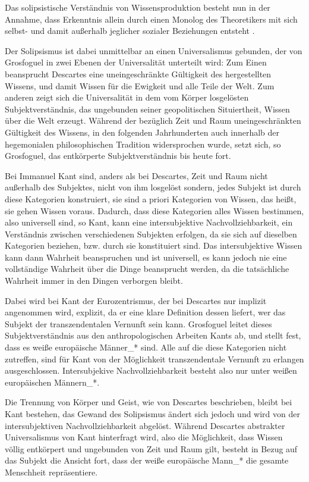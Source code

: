 Das solipsistische Verständnis von Wissensproduktion besteht nun in der
Annahme, dass Erkenntnis allein durch einen Monolog des Theoretikers mit sich
selbst- und damit außerhalb jeglicher sozialer Beziehungen entsteht
\footnotemark {}.

Der Solipsismus ist dabei unmittelbar an einen Universalismus gebunden, der von
Grosfoguel in zwei Ebenen der Universalität unterteilt wird: Zum Einen
beansprucht Descartes eine uneingeschränkte Gültigkeit des hergestellten
Wissens, und damit Wissen für die Ewigkeit und alle Teile der Welt. Zum anderen
zeigt sich die Universalität in dem vom Körper losgelösten Subjektverständnis,
das ungebunden seiner geopolitischen Situiertheit, Wissen über die Welt
erzeugt. Während der bezüglich Zeit und Raum  uneingeschränkten Gültigkeit des
Wissens, in den folgenden Jahrhunderten auch innerhalb der hegemonialen
philosophischen Tradition widersprochen wurde, setzt sich, so Grosfoguel, das
entkörperte Subjektverständnis bis heute fort.

Bei Immanuel Kant sind, anders als bei Descartes, Zeit und Raum nicht außerhalb
des Subjektes, nicht von ihm losgelöst sondern, jedes Subjekt ist durch diese
Kategorien konstruiert, sie sind a priori Kategorien von Wissen, das heißt, sie
gehen Wissen voraus.  Dadurch, dass diese Kategorien alles Wissen bestimmen,
also universell sind, so Kant, kann eine intersubjektive Nachvollziehbarkeit,
ein Verständnis zwischen verschiedenen Subjekten erfolgen, da sie sich auf
dieselben Kategorien beziehen, bzw. durch sie konstituiert sind.\footnotemark
{} Das intersubjektive Wissen kann dann Wahrheit
beanspruchen und ist universell, es kann jedoch nie eine vollständige Wahrheit
über die Dinge beansprucht werden, da die tatsächliche Wahrheit immer in den
Dingen verborgen bleibt. 

Dabei wird bei Kant der Eurozentrismus, der bei Descartes nur implizit
angenommen wird, explizit, da er eine klare Definition dessen liefert, wer das
Subjekt der transzendentalen Vernunft sein kann. Grosfoguel leitet dieses
Subjektverständnis aus den anthropologischen Arbeiten Kants ab, und stellt
fest, dass es weiße europäische Männer\_* sind. Alle auf die diese Kategorien
nicht zutreffen, sind für Kant von der Möglichkeit transzendentale Vernunft zu
erlangen ausgeschlossen.\footnotemark {}
 Intersubjekive Nachvollziehbarkeit besteht also nur
unter weißen europäischen Männern\_*.

Die Trennung von Körper und Geist, wie von Descartes beschrieben, bleibt bei
Kant bestehen, das Gewand des Solipsismus ändert sich jedoch und wird von der
intersubjektiven Nachvollziehbarkeit abgelöst. Während Descartes abstrakter
Universalismus von Kant hinterfragt wird, also die Möglichkeit, dass Wissen
völlig entkörpert und ungebunden von Zeit und Raum gilt, besteht in Bezug auf
das Subjekt die Ansicht fort, dass der weiße europäische Mann\_* die gesamte
Menschheit repräsentiere. 

